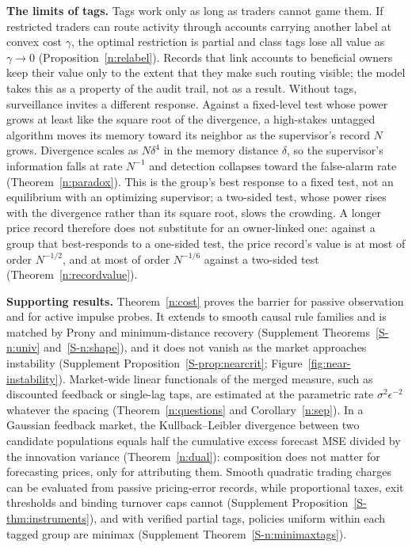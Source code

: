 \documentclass[11pt,letterpaper]{article}
\theoremstyle{definition}
\begin{document}
\textbf{The limits of tags.} Tags work only as long as traders cannot game them. If restricted traders can route activity through accounts carrying another label at convex cost $\gamma$, the optimal restriction is partial and class tags lose all value as $\gamma \to 0$ (Proposition~\ref{n:relabel}). Records that link accounts to beneficial owners keep their value only to the extent that they make such routing visible; the model takes this as a property of the audit trail, not as a result. Without tags, surveillance invites a different response. Against a fixed-level test whose power grows at least like the square root of the divergence, a high-stakes untagged algorithm moves its memory toward its neighbor as the supervisor's record $N$ grows. Divergence scales as $N\delta^4$ in the memory distance $\delta$, so the supervisor's information falls at rate $N^{-1}$ and detection collapses toward the false-alarm rate (Theorem~\ref{n:paradox}). This is the group's best response to a fixed test, not an equilibrium with an optimizing supervisor; a two-sided test, whose power rises with the divergence rather than its square root, slows the crowding. A longer price record therefore does not substitute for an owner-linked one: against a group that best-responds to a one-sided test, the price record's value is at most of order $N^{-1/2}$, and at most of order $N^{-1/6}$ against a two-sided test (Theorem~\ref{n:recordvalue}).

\textbf{Supporting results.} Theorem~\ref{n:cost} proves the barrier for passive observation and for active impulse probes. It extends to smooth causal rule families and is matched by Prony and minimum-distance recovery (Supplement Theorems~\ref{S-n:univ} and~\ref{S-n:shape}), and it does not vanish as the market approaches instability (Supplement Proposition~\ref{S-prop:nearcrit}; Figure~\ref{fig:near-instability}). Market-wide linear functionals of the merged measure, such as discounted feedback or single-lag taps, are estimated at the parametric rate $\sigma^2\epsilon^{-2}$ whatever the spacing (Theorem~\ref{n:questions} and Corollary~\ref{n:sep}). In a Gaussian feedback market, the Kullback--Leibler divergence between two candidate populations equals half the cumulative excess forecast MSE divided by the innovation variance (Theorem~\ref{n:dual}): composition does not matter for forecasting prices, only for attributing them. Smooth quadratic trading charges can be evaluated from passive pricing-error records, while proportional taxes, exit thresholds and binding turnover caps cannot (Supplement Proposition~\ref{S-thm:instruments}), and with verified partial tags, policies uniform within each tagged group are minimax (Supplement Theorem~\ref{S-n:minimaxtags}).
\end{document}
